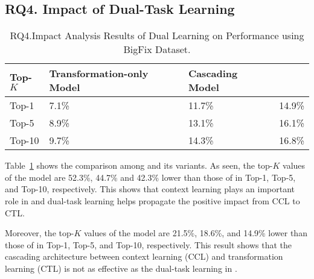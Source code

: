 \subsection{\bf RQ4. Impact of Dual-Task Learning}



\begin{table}[t]
  \caption{RQ4.Impact Analysis Results of Dual Learning on Performance using BigFix Dataset.}
  \vspace{-6pt}
	{\small
		\begin{center}
			\renewcommand{\arraystretch}{1}
			\begin{tabular}{p{1cm}<{\centering}|p{2.7cm}<{\centering}|p{1.7cm}<{\centering}|p{1cm}<{\centering}}
				\hline
				Top-$K$ & Transformation-only Model & Cascading Model &  \tool \\			
				\hline
				Top-1   & 7.1\% & 11.7\% & 14.9\% \\ \hline
				Top-5	& 8.9\% & 13.1\% & 16.1\% \\ \hline
				Top-10	& 9.7\% & 14.3\% & 16.8\%\\ \hline
			
				\hline
			\end{tabular}
			\label{fig:rq4_results}
		\end{center}
	}
\end{table}

Table~\ref{fig:rq4_results} shows the comparison among {\tool} and its
variants. As seen, the top-$K$ values of the
 model are 52.3\%, 44.7\% and 42.3\% lower
than those of {\tool} in Top-1, Top-5, and Top-10, respectively. This
shows that context learning plays an important role in {\tool} and
dual-task learning helps propagate the positive impact from CCL to
CTL.


Moreover, the top-$K$ values of the  model are 21.5\%,
18.6\%, and 14.9\% lower than those of {\tool} in Top-1, Top-5, and
Top-10, respectively. This result shows that the cascading
architecture between context learning (CCL) and transformation
learning (CTL) is not as effective as the dual-task learning
in {\tool}.

